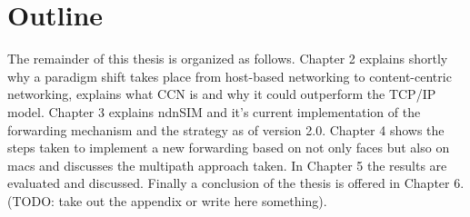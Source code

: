 \section{Outline}

The remainder of this thesis is organized as follows. Chapter 2 explains shortly why a paradigm shift takes place from host-based networking to content-centric networking, explains what CCN is and why it could outperform the TCP/IP model. Chapter 3 explains ndnSIM and it's current implementation of the forwarding mechanism and the strategy as of version 2.0. Chapter 4 shows the steps taken to implement a new forwarding based on not only faces but also on macs and discusses the multipath approach taken. In Chapter 5 the results are evaluated and discussed. Finally a conclusion of the thesis is offered in Chapter 6. (TODO: take out the appendix or write here something).
